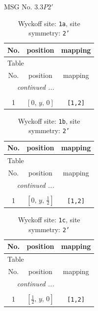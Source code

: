 \documentclass[fleqn,8pt]{jsarticle}
\begin{document}
\setcounter{MaxMatrixCols}{32}

\renewcommand{\tablename}{Table~}
\renewcommand{\figurename}{Figure~}
\begin{center}
\LARGE
MSG No. 3.3\quad$P2'$
\end{center}
\renewcommand{\arraystretch}{1.2}
\begin{longtable}{ccc}
\caption{Wyckoff site: {\tt 1a}, site symmetry: {\tt 2'}}
 \\
 \hline \hline
No. & position & mapping \\ \hline \endfirsthead

\multicolumn{2}{l}{\tablename\ \thetable{}} \\
 \hline \hline
No. & position & mapping \\ \hline \endhead

 \hline \hline
\multicolumn{2}{r}{\footnotesize\it continued ...} \\ \endfoot

 \hline \hline
\multicolumn{2}{r}{} \\ \endlastfoot

1 & $\left[ 0,\, y,\, 0 \right]$ & {\tt [1,2]} \\
\end{longtable}
\renewcommand{\arraystretch}{1.2}
\begin{longtable}{ccc}
\caption{Wyckoff site: {\tt 1b}, site symmetry: {\tt 2'}}
 \\
 \hline \hline
No. & position & mapping \\ \hline \endfirsthead

\multicolumn{2}{l}{\tablename\ \thetable{}} \\
 \hline \hline
No. & position & mapping \\ \hline \endhead

 \hline \hline
\multicolumn{2}{r}{\footnotesize\it continued ...} \\ \endfoot

 \hline \hline
\multicolumn{2}{r}{} \\ \endlastfoot

1 & $\left[ 0,\, y,\, \frac{1}{2} \right]$ & {\tt [1,2]} \\
\end{longtable}
\renewcommand{\arraystretch}{1.2}
\begin{longtable}{ccc}
\caption{Wyckoff site: {\tt 1c}, site symmetry: {\tt 2'}}
 \\
 \hline \hline
No. & position & mapping \\ \hline \endfirsthead

\multicolumn{2}{l}{\tablename\ \thetable{}} \\
 \hline \hline
No. & position & mapping \\ \hline \endhead

 \hline \hline
\multicolumn{2}{r}{\footnotesize\it continued ...} \\ \endfoot

 \hline \hline
\multicolumn{2}{r}{} \\ \endlastfoot

1 & $\left[ \frac{1}{2},\, y,\, 0 \right]$ & {\tt [1,2]} \\
\end{longtable}
\end{document}
